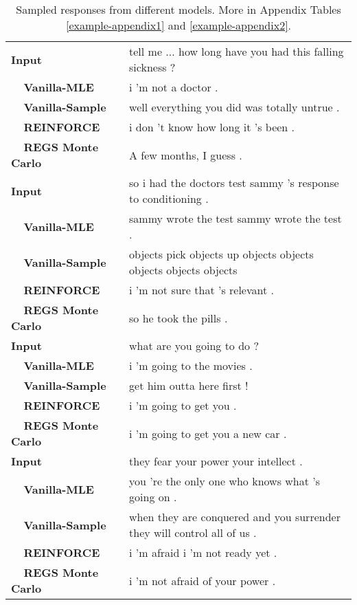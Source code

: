 \documentclass[11pt]{article}
\begin{document}
\begin{table*}[t]
\centering
\footnotesize
\begin{tabular}{p{4cm}p{11cm}}\hline
{\bf Input}&tell me ... how long have you had this falling sickness ?\\
{\bf ~~Vanilla-MLE}&i 'm not a doctor .\\
{\bf ~~Vanilla-Sample}&well everything you did was totally untrue .\\
{\bf ~~REINFORCE}&i don 't know how long it 's been .\\
{\bf ~~REGS Monte Carlo}& A few months, I guess .\\\hline
{\bf Input}&so i had the doctors test sammy 's response to conditioning .\\
{\bf ~~Vanilla-MLE}&sammy wrote the test sammy wrote the test .\\
{\bf ~~Vanilla-Sample}&objects pick objects up objects objects objects objects objects \\
{\bf ~~REINFORCE}&i 'm not sure that 's relevant .\\
{\bf ~~REGS Monte Carlo}&so he took the pills .\\\hline
{\bf Input}&what are you going to do ?\\
{\bf ~~Vanilla-MLE}&i 'm going to the movies .\\
{\bf ~~Vanilla-Sample}&get him outta here first !\\
{\bf ~~REINFORCE}&i 'm going to get you .\\
{\bf ~~REGS Monte Carlo}&i 'm going to get you a new car .\\\hline
{\bf Input}&they fear your power your intellect .\\
{\bf ~~Vanilla-MLE}&you 're the only one who knows what 's going on .\\
{\bf ~~Vanilla-Sample}&when they are conquered and you surrender they will control all of us .\\
{\bf ~~REINFORCE}&i 'm afraid i 'm not ready yet .\\
{\bf ~~REGS Monte Carlo}&i 'm not afraid of your power .\\\hline
\end{tabular}
\caption{Sampled responses from different models. More in Appendix Tables \ref{example-appendix1} and \ref{example-appendix2}.}
\end{table*}
\end{document}
